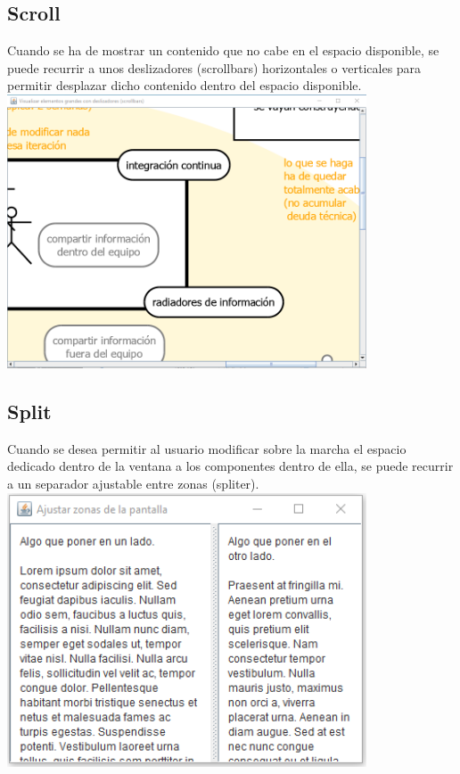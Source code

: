 \documentclass[spanish,12pt,a4paper,final,oneside]{book}
\begin{document}
\subsection{Scroll}\label{ejercicio_scroll}
Cuando se ha de mostrar un contenido que no cabe en el espacio disponible, se puede recurrir a unos deslizadores (scrollbars) horizontales o verticales para permitir desplazar dicho contenido dentro del espacio disponible.
\\ \includegraphics[width=0.8\textwidth]{Scroll - pantallazo - Java}

\subsection{Split}\label{ejercicio_split}
Cuando se desea permitir al usuario modificar sobre la marcha el espacio dedicado dentro de la ventana a los componentes dentro de ella, se puede recurrir a un separador ajustable entre zonas (spliter).
\\ \includegraphics[width=0.8\textwidth]{Split - pantallazo - Java}
\end{document}
